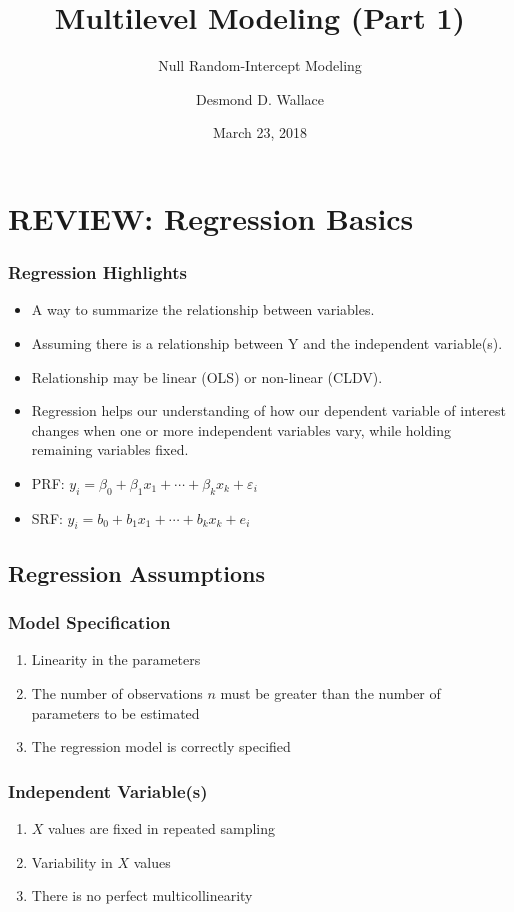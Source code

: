\documentclass{beamer}
\title[MLM I]{Multilevel Modeling (Part 1)}
\subtitle[ISRC Workshop]{Null Random-Intercept Modeling}
\author[Wallace]{Desmond D. Wallace}
\institute[University of Iowa]{Department of Political Science\\The University of Iowa\\Iowa City, IA}
\date{March 23, 2018}
\begin{document}
\begin{frame}
	\titlepage
\end{frame}


\section{REVIEW: Regression Basics}

\begin{frame}
	\frametitle{Regression Highlights}
	\begin{itemize}
		\item A way to summarize the relationship between variables.
		\item Assuming there is a relationship between Y and the independent variable(s).
		\item Relationship may be linear (OLS) or non-linear (CLDV).
		\item Regression helps our understanding of how our dependent variable of interest changes when one or more independent variables vary, while holding remaining variables fixed.
		\item PRF: $y_{i}=\beta_{0}+\beta_{1}x_{1}+\cdots+\beta_{k}x_{k}+\varepsilon_{i}$
		\item SRF: $y_{i}=b_{0}+b_{1}x_{1}+\cdots+b_{k}x_{k}+e_{i}$
	\end{itemize}
\end{frame}

\subsection{Regression Assumptions}

\begin{frame}
	\frametitle{Model Specification}
		\begin{enumerate}
			\item Linearity in the parameters
			\item The number of observations $n$ must be greater than the number of parameters to be estimated
			\item The regression model is correctly specified
		\end{enumerate}
\end{frame}

\begin{frame}
	\frametitle{Independent Variable(s)}
		\begin{enumerate}
			\item $X$ values are fixed in repeated sampling
			\item Variability in $X$ values
			\item There is no perfect multicollinearity
		\end{enumerate}
\end{frame}
\end{document}

